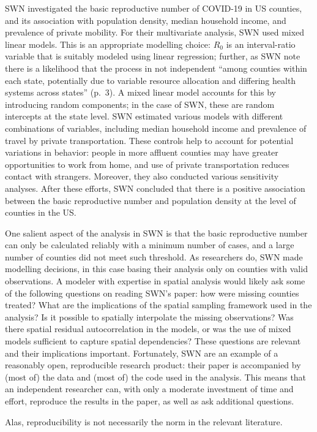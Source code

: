 \documentclass[]{elsarticle} %
\begin{document}
SWN investigated the basic reproductive number of COVID-19 in US
counties, and its association with population density, median household
income, and prevalence of private mobility. For their multivariate
analysis, SWN used mixed linear models. This is an appropriate modelling
choice: \(R_0\) is an interval-ratio variable that is suitably modeled
using linear regression; further, as SWN note there is a likelihood that
the process in not independent ``among counties within each state,
potentially due to variable resource allocation and differing health
systems across states'' (p.~3). A mixed linear model accounts for this
by introducing random components; in the case of SWN, these are random
intercepts at the state level. SWN estimated various models with
different combinations of variables, including median household income
and prevalence of travel by private transportation. These controls help
to account for potential variations in behavior: people in more affluent
counties may have greater opportunities to work from home, and use of
private transportation reduces contact with strangers. Moreover, they
also conducted various sensitivity analyses. After these efforts, SWN
concluded that there is a positive association between the basic
reproductive number and population density at the level of counties in
the US.

One salient aspect of the analysis in SWN is that the basic reproductive
number can only be calculated reliably with a minimum number of cases,
and a large number of counties did not meet such threshold. As
researchers do, SWN made modelling decisions, in this case basing their
analysis only on counties with valid observations. A modeler with
expertise in spatial analysis would likely ask some of the following
questions on reading SWN's paper: how were missing counties treated?
What are the implications of the spatial sampling framework used in the
analysis? Is it possible to spatially interpolate the missing
observations? Was there spatial residual autocorrelation in the models,
or was the use of mixed models sufficient to capture spatial
dependencies? These questions are relevant and their implications
important. Fortunately, SWN are an example of a reasonably open,
reproducible research product: their paper is accompanied by (most of)
the data and (most of) the code used in the analysis. This means that an
independent researcher can, with only a moderate investment of time and
effort, reproduce the results in the paper, as well as ask additional
questions.

Alas, reproducibility is not necessarily the norm in the relevant
literature.
\end{document}
